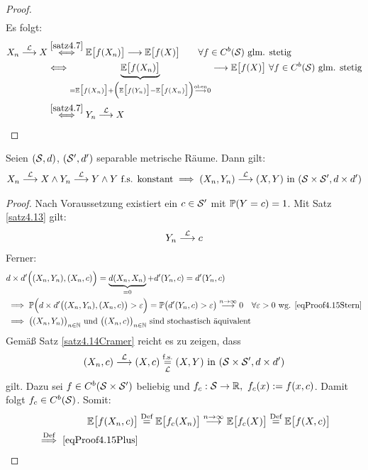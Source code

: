 \begin{proof}
\begin{align*}
\end{align*}
Es folgt:
\begin{align*}
X_n\stackrel{\L}{\longrightarrow} X
&\stackrel{\ref{satz4.7}}{\Longleftrightarrow}
\E\big[f(X_n)\big]\longrightarrow\E\big[f(X)\big]\qquad\forall f\in C^b(\S)\text{ glm. stetig}\\
&\Longleftrightarrow
\underbrace{\E\big[f(X_n)\big]}_{=\E\big[f(X_n)\big]+\Big(\E\big[f(Y_n)\big]-\E\big[ f(X_n)\big]\Big)\stackrel{\text{oben}}{\longrightarrow}0}\stackrel{}{\longrightarrow}\E\big[f(X)\big]~\forall f\in C^b(\S)\text{ glm. stetig}\\
&\stackrel{\ref{satz4.7}}{\Longleftrightarrow}
Y_n\stackrel{\L}{\longrightarrow} X
\end{align*}
\end{proof}

\pagebreak[4]
\begin{satz}\label{satz4.15CramerSlutsky}\enter
Seien $(\S,d)$, $(\S',d')$ separable metrische Räume. Dann gilt:
\begin{align*}
X_n\stackrel{\L}{\longrightarrow} X\wedge Y_n\stackrel{\L}{\longrightarrow} Y\wedge Y\text{ f.s. konstant}
\implies (X_n,Y_n)\stackrel{\L}{\longrightarrow}(X,Y)\text{ in }(\S\times\S',d\times d')
\end{align*}
\end{satz}
\begin{proof}
Nach Voraussetzung existiert ein $c\in\S'$ mit $\P(Y=c)=1$. Mit Satz \ref{satz4.13} gilt:
\begin{align}\label{eqProof4.15Stern}
Y_n\stackrel{\L}{\longrightarrow} c
\end{align}
Ferner:
\begin{align*}
&d\times d'\Big((X_n,Y_n),(X_n,c)\Big)
=\underbrace{d(X_n,X_n)}_{=0}+d'(Y_n,c)
=d'(Y_n,c)\\
&\implies\P\Big(d\times d'\big((X_n,Y_n),(X_n,c)\big)>\varepsilon\Big)
=\P\big(d'(Y_n,c)>\varepsilon\big)
\stackrel{n\to\infty}{\longrightarrow} 0\quad\forall\varepsilon>0\text{ wg. } \eqref{eqProof4.15Stern}\\
&\implies
\big((X_n,Y_n)\big)_{n\in\N}\text{ und }\big((X_n,c)\big)_{n\in\N}\text{ sind stochastisch äquivalent}
\end{align*}
Gemäß Satz \ref{satz4.14Cramer} reicht es zu zeigen, dass
\begin{align}\label{eqProof4.15Plus}
(X_n,c)\stackrel{\L}{\longrightarrow}(X,c)\stackrelnew{\L}{\text{f.s.}}{=}(X,Y)\text{ in }(\S\times\S',d\times d')
\end{align}
gilt. Dazu sei $f\in C^b(\S\times\S')$ beliebig und $f_c:\S\to\R,~f_c(x):=f(x,c)$. Damit folgt $f_c\in C^b(\S)$. Somit:
\begin{align*}
\E\big[f(X_n,c)\big]
&\stackeq{\text{Def}}
\E\big[f_c(X_n)\big]
\stackrel{n\to\infty}{\longrightarrow}\E\big[f_c(X)\big]\stackeq{\text{Def}}
\E\big[f(X,c)\big]\\
\stackrel{\text{Def}}{\implies}
\eqref{eqProof4.15Plus}
\end{align*}
\end{proof}

